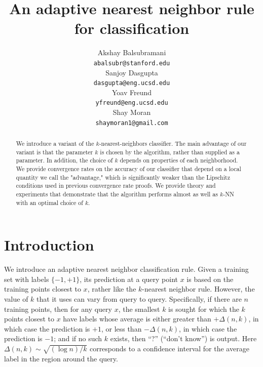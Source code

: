 \documentclass{article}
\title{An adaptive nearest neighbor rule for classification}
\author{
Akshay Balsubramani \\
\texttt{abalsubr@stanford.edu} \\
\And
Sanjoy Dasgupta \\
\texttt{dasgupta@eng.ucsd.edu} \\
\And
Yoav Freund \\
\texttt{yfreund@eng.ucsd.edu} \\
\And
Shay Moran\\
\texttt{shaymoran1@gmail.com} \\
}
\begin{document}
\maketitle

\begin{abstract}
We introduce a variant of the $k$-nearest-neighbors classifier. The main advantage of our variant is that the parameter $k$ is chosen by the algorithm, rather than supplied as a parameter. In addition, the choice of $k$ depends on properties of each neighborhood.  We provide convergence rates on the accuracy of our classifier that depend on a local quantity we call the "advantage," which is significantly weaker than the Lipschitz conditions used in previous convergence rate proofs. We provide theory and experiments that demonstrate that the algorithm performs almost as well as $k$-NN with an optimal choice of $k$.
\end{abstract}

\section{Introduction}

We introduce an adaptive nearest neighbor classification rule. Given a
training set with labels $\{-1,+1\}$, its prediction at a query point $x$ is based on the training points closest to $x$, rather like
the $k$-nearest neighbor rule. However, the value of $k$ that it uses
can vary from query to query. Specifically, if there are $n$ training
points, then for any query $x$, the smallest $k$ is sought for which
the $k$ points closest to $x$ have labels whose average is either
greater than $+\Delta(n,k)$, in which case the prediction is $+1$, or
less than $- \Delta(n,k)$, in which case the prediction is $-1$; and
if no such $k$ exists, then ``?'' (``don't know'') is output.  Here $\Delta(n,k) \sim \sqrt{(\log n)/k}$ corresponds to a confidence interval for the average label in the region around the query.
\end{document}
